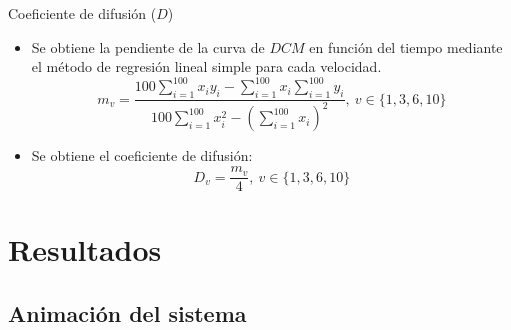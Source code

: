 \documentclass{beamer}
\begin{document}
            \begin{frame}{Coeficiente de difusión ($D$)}
                \begin{itemize}
                    \item Se obtiene la pendiente de la curva de $DCM$ en función del tiempo mediante el método
                    de regresión lineal simple para cada velocidad.
                    \begin{equation*}
                        m_v = \frac{100 \sum_{i=1}^{100} x_i y_i - \sum_{i=1}^{100} x_i \sum_{i=1}^{100} y_i }{100 \sum_{i=1}^{100} x_i^2
                        - \left(\sum_{i=1}^{100} x_i \right)^2},\ v \in \{1, 3, 6, 10\}
                    \end{equation*}
                    \item Se obtiene el coeficiente de difusión:
                    \begin{equation*}
                        D_v = \frac{m_v}{4},\ v \in \{1, 3, 6, 10\}
                    \end{equation*}
                \end{itemize}
            \end{frame}

    \section{Resultados}

        \subsection{Animación del sistema}
\end{document}
